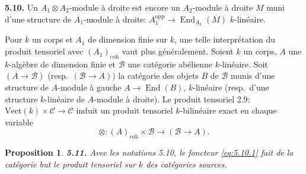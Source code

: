 \documentclass[12pt,a4paper]{article}
\theoremstyle{plain}
\newtheorem{proposition}[theorem]{Proposition}
\theoremstyle{definition}
\theoremstyle{remark}
\DeclareMathOperator{\End}{End}
\begin{document}
\textbf{5.10.} Un $A_1 \otimes A_2$-module à droite est encore un $A_2$-module à droite $M$ muni d'une structure de $A_1$-module à droite: $A_1^\mathrm{opp} \to \End_{A_2}(M)$ $k$-linéaire.

Pour $k$ un corps et $A_1$ de dimension finie sur $k$, une telle interprétation du produit tensoriel avec $(A_1)_\mathrm{coh}$ vaut plus généralement. Soient $k$ un corps, $A$ une $k$-algèbre de dimension finie et $\mathcal{B}$ une catégorie abélienne $k$-linéaire. Soit $(A \to \mathcal{B})$ (resp.~$(\mathcal{B} \to A)$) la catégorie des objets $B$ de $\mathcal{B}$ munis d'une structure de $A$-module à gauche $A \to \End(B)$, $k$-linéaire (resp.~d'une structure $k$-linéaire de $A$-module à droite). Le produit tensoriel 2.9: $\mathrm{Vect}(k) \times \mathcal{C} \to \mathcal{C}$ induit un produit tensoriel $k$-bilinéaire exact en chaque variable
\begin{equation}\label{eq:5.10.1}
\otimes : (A)_\mathrm{coh} \times \mathcal{B} \longrightarrow (\mathcal{B} \to A).
\end{equation}

\begin{proposition}\label{prop:5.11}
\textbf{5.11.} Avec les notations 5.10, le foncteur \eqref{eq:5.10.1} fait de la catégorie but le produit tensoriel sur $k$ des catégories sources.
\end{proposition}
\end{document}
